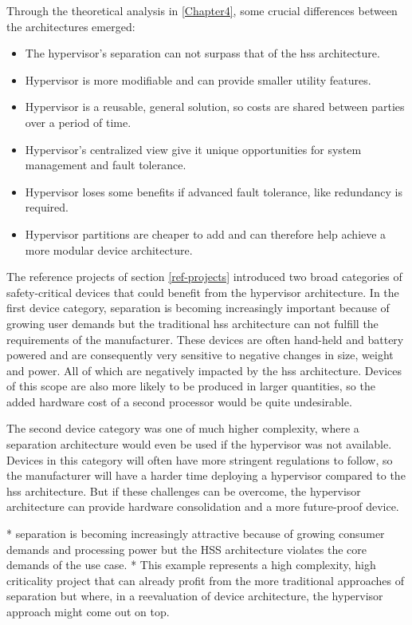 Through the theoretical analysis in \ref{Chapter4}, some crucial differences between the architectures emerged:
\begin{itemize}
    \item The hypervisor's separation can not surpass that of the \acrshort{hss} architecture.
    \item Hypervisor is more modifiable and can provide smaller utility features.
    \item Hypervisor is a reusable, general solution, so costs are shared between parties over a period of time.
    \item Hypervisor's centralized view give it unique opportunities for system management and fault tolerance.
    \item Hypervisor loses some benefits if advanced fault tolerance, like redundancy is required.
    \item Hypervisor partitions are cheaper to add and can therefore help achieve a more modular device architecture.
\end{itemize}

The reference projects of section \ref{ref-projects} introduced two broad categories of safety-critical devices that could benefit from the hypervisor architecture. In the first device category, separation is becoming increasingly important because of growing user demands but the traditional \acrshort{hss} architecture can not fulfill the requirements of the manufacturer. These devices are often hand-held and battery powered and are consequently very sensitive to negative changes in size, weight and power. All of which are negatively impacted by the \acrshort{hss} architecture.
Devices of this scope are also more likely to be produced in larger quantities, so the added hardware cost of a second processor would be quite undesirable.

The second device category was one of much higher complexity, where a separation architecture would even be used if the hypervisor was not available. Devices in this category will often have more stringent regulations to follow, so the manufacturer will have a harder time deploying a hypervisor compared to the \acrshort{hss} architecture. But if these challenges can be overcome, the hypervisor architecture can provide hardware consolidation and a more future-proof device.

* separation is becoming increasingly attractive because of growing consumer demands and processing power but the HSS architecture violates the core demands of the use case.
* This example represents a high complexity, high criticality project that can already profit from the more traditional approaches of separation but where, in a reevaluation of device architecture, the hypervisor approach might come out on top.

